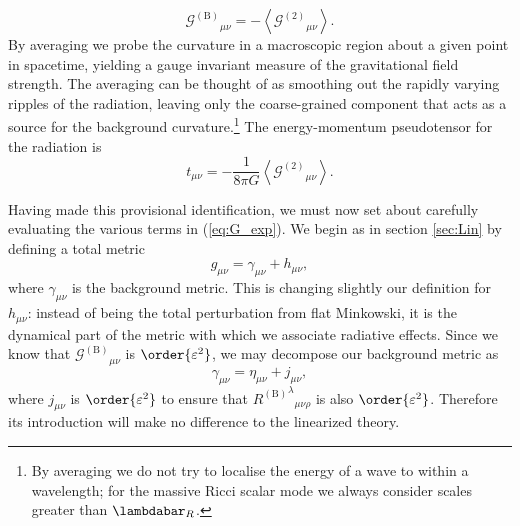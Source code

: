 \documentclass[aps,prd,reprint,showpacs]{revtex4-1}
\newcommand{\eqnref}[1]{(\ref{eq:#1})}
\newcommand{\secref}[1]{section \ref{sec:#1}}
\newcommand{\recip}[1]{\ensuremath{\frac{1}{#1}}}
\begin{document}
\begin{equation}
{\mathcal{G}^{(\text{B})}}_{\mu\nu} = -\left\langle{\mathcal{G}^{(2)}}_{\mu\nu}\right\rangle.
\end{equation}
By averaging we probe the curvature in a macroscopic region about a given point in spacetime, yielding a gauge invariant measure of the gravitational field strength. The averaging can be thought of as smoothing out the rapidly varying ripples of the radiation, leaving only the coarse-grained component that acts as a source for the background curvature.\footnote{By averaging we do not try to localise the energy of a wave to within a wavelength; for the massive Ricci scalar mode we always consider scales greater than $\lambdabar_R$.} The energy-momentum pseudotensor for the radiation is
\begin{equation}
t_{\mu\nu} = -\recip{8\pi G}\left\langle{\mathcal{G}^{(\text{2})}}_{\mu\nu}\right\rangle.
\end{equation}

Having made this provisional identification, we must now set about carefully evaluating the various terms in \eqnref{G_exp}. We begin as in \secref{Lin} by defining a total metric
\begin{equation}
g_{\mu\nu} = \gamma_{\mu\nu} + h_{\mu\nu},
\end{equation}
where $\gamma_{\mu\nu}$ is the background metric. This is changing slightly our definition for $h_{\mu\nu}$: instead of being the total perturbation from flat Minkowski, it is the dynamical part of the metric with which we associate radiative effects. Since we know that ${\mathcal{G}^{(\text{B})}}_{\mu\nu}$ is $\order{\varepsilon^2}$, we may decompose our background metric as
\begin{equation}
\gamma_{\mu\nu} = \eta_{\mu\nu} + j_{\mu\nu},
\end{equation}
where $j_{\mu\nu}$ is $\order{\varepsilon^2}$ to ensure that ${{R^{(\text{B})}}^\lambda}_{\mu\nu\rho}$ is also $\order{\varepsilon^2}$. Therefore its introduction will make no difference to the linearized theory.
\end{document}

